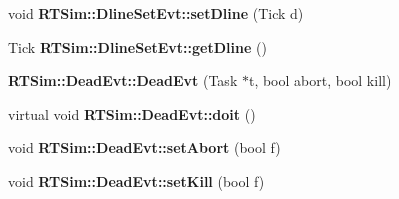 \begin{DoxyCompactItemize}
\item 
void {\bfseries R\+T\+Sim\+::\+Dline\+Set\+Evt\+::set\+Dline} (Tick d)\hypertarget{group__tasks_gad235df2a722870c1c9908be20f65aa8a}{}\label{group__tasks_gad235df2a722870c1c9908be20f65aa8a}

\item 
Tick {\bfseries R\+T\+Sim\+::\+Dline\+Set\+Evt\+::get\+Dline} ()\hypertarget{group__tasks_gad4ed29b5025a99be6c28c95e3e98794a}{}\label{group__tasks_gad4ed29b5025a99be6c28c95e3e98794a}

\item 
{\bfseries R\+T\+Sim\+::\+Dead\+Evt\+::\+Dead\+Evt} (Task $\ast$t, bool abort, bool kill)\hypertarget{group__tasks_gafba0bad997325c9d10ae392f2bb5e747}{}\label{group__tasks_gafba0bad997325c9d10ae392f2bb5e747}

\item 
virtual void {\bfseries R\+T\+Sim\+::\+Dead\+Evt\+::doit} ()\hypertarget{group__tasks_ga33f18cd0759ed8f86530b45fdeb88e10}{}\label{group__tasks_ga33f18cd0759ed8f86530b45fdeb88e10}

\item 
void {\bfseries R\+T\+Sim\+::\+Dead\+Evt\+::set\+Abort} (bool f)\hypertarget{group__tasks_gaaa5b6deea47254d5af89a20eadd49a73}{}\label{group__tasks_gaaa5b6deea47254d5af89a20eadd49a73}

\item 
void {\bfseries R\+T\+Sim\+::\+Dead\+Evt\+::set\+Kill} (bool f)\hypertarget{group__tasks_ga47d12b9f3a3821ef73803935be31d119}{}\label{group__tasks_ga47d12b9f3a3821ef73803935be31d119}

\end{DoxyCompactItemize}
